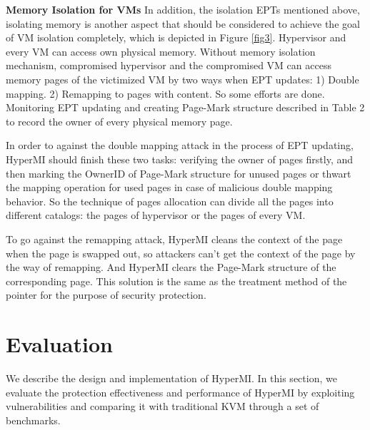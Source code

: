 \documentclass[conference]{IEEEtran}
\begin{document}
\textbf{Memory Isolation for VMs }
In addition, the isolation EPTs mentioned above, isolating memory is another aspect that should be considered to achieve the goal of VM isolation completely, which is depicted in Figure \ref{fig3}. 
Hypervisor and every VM can access own physical memory. Without memory isolation mechanism, compromised hypervisor and the compromised VM can access memory pages of the victimized VM by two ways when EPT updates: 1) Double mapping. 2) Remapping to pages with content. So some efforts are done. Monitoring EPT updating and creating Page-Mark structure described in Table 2 to record the owner of every physical memory page. 



In order to against the double mapping attack in the process of EPT updating, HyperMI should finish these two tasks: verifying the owner of pages firstly, and then marking the OwnerID of Page-Mark structure for unused pages or thwart the mapping operation for used pages in case of malicious double mapping behavior. So the technique of pages allocation can divide all the pages into different catalogs: the pages of hypervisor or the pages of every VM.

To go against the remapping attack, HyperMI cleans the context of the page when the page is swapped out, so attackers can't get the context of the page by the way of remapping. And HyperMI clears the Page-Mark structure of the corresponding page. This solution is the same as the treatment method of the pointer for the purpose of security protection. 



\section{Evaluation}\label{sec:evaluation}
We describe the design and implementation of HyperMI. In this section, we evaluate the protection effectiveness
and performance of HyperMI by exploiting vulnerabilities and comparing it with traditional KVM through a set of benchmarks.
\end{document}
